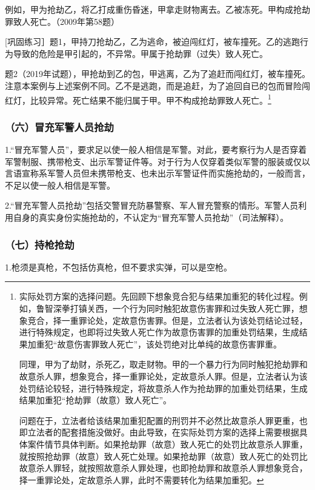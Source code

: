 例如，甲为抢劫乙，将乙打成重伤昏迷，甲拿走财物离去。乙被冻死。甲构成抢劫罪致人死亡。（2009年第58题）

[巩固练习］题1，甲持刀抢劫乙，乙为逃命，被迫闯红灯，被车撞死。乙的逃跑行为导致的危险是甲引起的，不异常。甲属于抢劫罪（过失）致人死亡。

题2（2019年试题），甲抢劫到乙的包，甲逃离，乙为了追赶而闯红灯，被车撞死。注意本案例与上述案例不同。乙不是逃跑，而是追赶，为了追回自已的包而冒险闯红灯，比较异常。死亡结果不能归属于甲。甲不构成抢劫罪致人死亡。\footnote{实际处罚方案的选择问题。先回顾下想象竞合犯与结果加重犯的转化过程。例如，鲁智深拳打镇关西，一个行为同时触犯故意伤害罪和过失致人死亡罪，想象竞合，择一重罪论处，定故意伤害罪。但是，立法者认为该处罚结论过轻，进行特殊规定，也即将过失致人死亡作为故意伤害罪的加重处罚结果，生成结果加重犯“故意伤害罪致人死亡”，该处罚绝对比单纯的故意伤害罪重。

同理，甲为了劫财，杀死乙，取走财物。甲的一个暴力行为同时触犯抢劫罪和故意杀人罪，想象竞合，择一重罪论处，定故意杀人罪。但是，立法者认为该处罚结论较轻，进行特殊规定，将故意杀人作为抢劫罪的加重处罚结果，生成结果加重犯“抢劫罪（故意）致人死亡”。

问题在于，立法者给该结果加重犯配置的刑罚并不必然比故意杀人罪更重，也即立法者的配套措施没做好。由此导致，在实际处罚方案的选择上需要根据具体案件情节具体判断。如果抢劫罪（故意）致人死亡的处罚比故意杀人罪重，就按照抢劫罪（故意）致人死亡处理。如果抢劫罪（故意）致人死亡的处罚比故意杀人罪轻，就按照故意杀人罪处理，也即抢劫罪和故意杀人罪想象竞合，择一重罪论处，定故意杀人罪，此时不需要转化为结果加重犯。}

\subsubsection*{（六）冒充军警人员抢劫}

1.“冒充军警人员”，要求足以使一般人相信是军警。对此，要考察行为人是否穿着军警制服、携带枪支、出示军警证件等。对于行为人仅穿着类似军警的服装或仅以言语宣称系军警人员但未携带枪支、也未出示军警证件而实施抢劫的，一般而言，不足以使一般人相信是军警。

2.“冒充军警人员抢劫”包括交警冒充防暴警察、军人冒充警察的情形。军警人员利用自身的真实身份实施抢劫的，不认定为“冒充军警人员抢劫”（司法解释）。

\subsubsection*{（七）持枪抢劫}

1.枪须是真枪，不包括仿真枪，但不要求实弹，可以是空枪。

